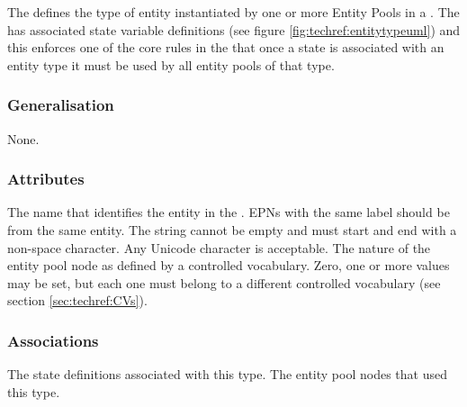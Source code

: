 The  defines the type of entity instantiated by one or more Entity
Pools in a \PDm. The  has associated state
variable definitions (see figure \ref{fig:techref:entitytypeuml}) and
this enforces one of the core rules in the \PDl that once a state is
associated with an entity type it must be used by all entity pools of
that type.


\subsubsection{Generalisation}

None.

\subsubsection{Attributes}

\begin{attributes}
   The name that identifies the entity in the
  \PDm. EPNs with the same label should be from the same entity. The
  string cannot be empty and must start and end with a non-space
  character. Any Unicode character is acceptable.
   The nature of the entity pool node as defined
  by a controlled vocabulary. Zero, one or more values may be set, but
  each one must belong to a different controlled vocabulary (see
  section \ref{sec:techref:CVs}).
\end{attributes}


\subsubsection{Associations}

\begin{attributes}
   The state
  definitions associated with this type.
 The entity pool nodes that
used this type.
\end{attributes}

